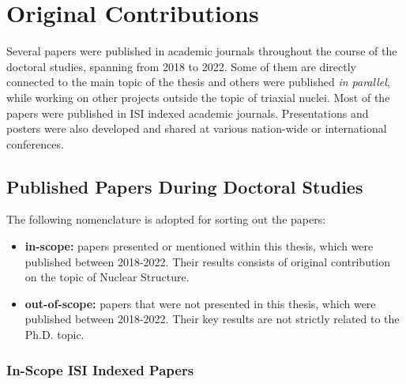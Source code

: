\chapter{Original Contributions}
\label{appendix:contributions}

Several papers were published in academic journals throughout the course of the doctoral studies, spanning from 2018 to 2022. Some of them are directly connected to the main topic of the thesis and others were published \emph{in parallel}, while working on other projects outside the topic of triaxial nuclei. Most of the papers were published in ISI indexed academic journals. Presentations and posters were also developed and shared at various nation-wide or international conferences.

\section{Published Papers During Doctoral Studies}

The following nomenclature is adopted for sorting out the papers:
\begin{itemize}
    \item \textbf{in-scope:} papers presented or mentioned within this thesis, which were published between 2018-2022. Their results consists of original contribution on the topic of Nuclear Structure. 
    \item \textbf{out-of-scope:} papers that were not presented in this thesis, which were published between 2018-2022. Their key results are not strictly related to the Ph.D. topic.
\end{itemize}

\subsection{In-Scope ISI Indexed Papers}

